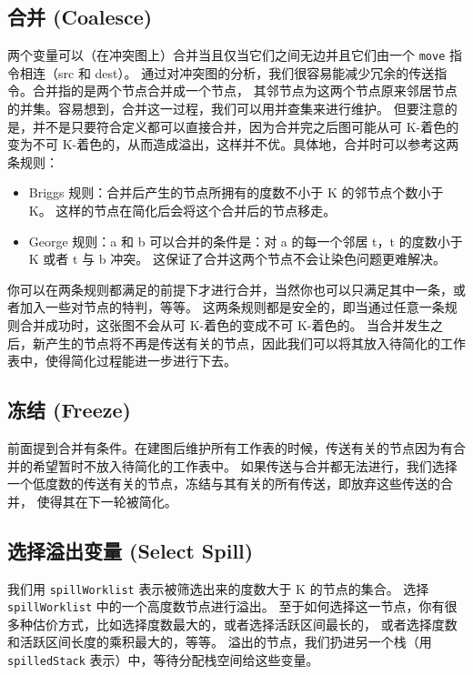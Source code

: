 \subsection{合并 (Coalesce)} \label{opt-graph-coalesce}

两个变量可以（在冲突图上）合并当且仅当它们之间无边并且它们由一个 \texttt{move} 指令相连（src 和 dest）。
通过对冲突图的分析，我们很容易能减少冗余的传送指令。合并指的是两个节点合并成一个节点，
其邻节点为这两个节点原来邻居节点的并集。容易想到，合并这一过程，我们可以用并查集来进行维护。
但要注意的是，并不是只要符合定义都可以直接合并，因为合并完之后图可能从可 K-着色的变为不可 K-着色的，从而造成溢出，这样并不优。具体地，合并时可以参考这两条规则：
\begin{itemize}
    \item Briggs 规则：合并后产生的节点所拥有的度数不小于 K 的邻节点个数小于 K。
        这样的节点在简化后会将这个合并后的节点移走。
    \item George 规则：a 和 b 可以合并的条件是：对 a 的每一个邻居 t，t 的度数小于 K 或者 t 与 b 冲突。
        这保证了合并这两个节点不会让染色问题更难解决。
\end{itemize}

你可以在两条规则都满足的前提下才进行合并，当然你也可以只满足其中一条，或者加入一些对节点的特判，等等。
这两条规则都是安全的，即当通过任意一条规则合并成功时，这张图不会从可 K-着色的变成不可 K-着色的。
当合并发生之后，新产生的节点将不再是传送有关的节点，因此我们可以将其放入待简化的工作表中，使得简化过程能进一步进行下去。

\subsection{冻结 (Freeze)} \label{opt-graph-freeze}

前面提到合并有条件。在建图后维护所有工作表的时候，传送有关的节点因为有合并的希望暂时不放入待简化的工作表中。
如果传送与合并都无法进行，我们选择一个低度数的传送有关的节点，冻结与其有关的所有传送，即放弃这些传送的合并，
使得其在下一轮被简化。

\subsection{选择溢出变量 (Select Spill)} \label{opt-graph-select-spill}

我们用 \texttt{spillWorklist} 表示被筛选出来的度数大于 K 的节点的集合。
选择 \texttt{spillWorklist} 中的一个高度数节点进行溢出。
至于如何选择这一节点，你有很多种估价方式，比如选择度数最大的，或者选择活跃区间最长的，
或者选择度数和活跃区间长度的乘积最大的，等等。
溢出的节点，我们扔进另一个栈（用 \texttt{spilledStack} 表示）中，等待分配栈空间给这些变量。

